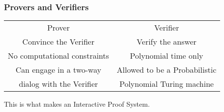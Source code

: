 \documentclass{beamer}
\begin{document}
\begin{frame}[label=pca]
\frametitle{Provers and Verifiers}
\begin{center}
\begin{tabular}{ c c }
{\LARGE Prover} & {\LARGE Verifier} \\
Convince the Verifier & Verify the answer \\
No computational constraints & Polynomial time only \\
\pause
Can engage in a two-way & Allowed to be a Probabilistic \\
dialog with the Verifier & Polynomial Turing machine \\
\end{tabular}
\end{center}
\pause
This is what makes an Interactive Proof System.
\end{frame}


\end{document}

